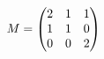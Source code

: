 \documentclass[preview]{standalone}
\begin{document}
\begin{align*}
\special{dvisvgm:raw <g id='unique000'>}M=\begin{pmatrix}2&1&1\\1&1&0\\0&0&2\end{pmatrix}\special{dvisvgm:raw </g>}
\end{align*}
\end{document}
